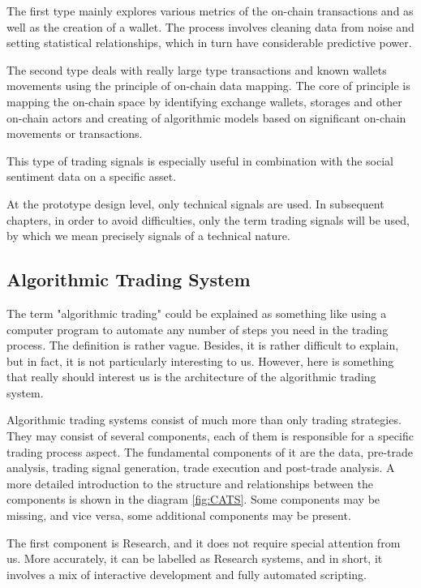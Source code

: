 \documentclass[thesis=B,english]{FITthesis}[2019/03/06]
\begin{document}
\begin{itemize}
The first type mainly explores various metrics of the on-chain transactions and as well as the creation of a wallet. The process involves cleaning data from noise and setting statistical relationships,  which in turn have considerable predictive power.

The second type deals with really large type transactions and known wallets movements using the principle of on-chain data mapping.  The core of principle is mapping the on-chain space by identifying exchange wallets, storages and other on-chain actors and creating of algorithmic models based on significant on-chain movements or transactions.

This type of trading signals is especially useful in combination with the social sentiment data on a specific asset.
\end{itemize}
At the prototype design level, only technical signals are used. In subsequent chapters, in order to avoid difficulties, only the term trading signals will be used, by which we mean precisely signals of a technical nature.

\subsection{Algorithmic Trading System}
The term "algorithmic trading" could be explained as something like using a computer program to automate any number of steps you need in the trading process. The definition is rather vague. Besides, it is rather difficult to explain, but in fact, it is not particularly interesting to us. However, here is something that really should interest us is the architecture of the algorithmic trading system.

Algorithmic trading systems consist of much more than only trading strategies. They may consist of several components, each of them is responsible for a specific trading process aspect. The fundamental components of it are the data, pre-trade analysis, trading signal generation, trade execution and post-trade analysis.  A more detailed introduction to the structure and relationships between the components is shown in the diagram \ref{fig:CATS}. Some components may be missing, and vice versa, some additional components may be present.

The first component is Research, and it does not require special attention from us. More accurately, it can be labelled as Research systems, and in short,  it involves a mix of interactive development and fully automated scripting. 
\end{document}

